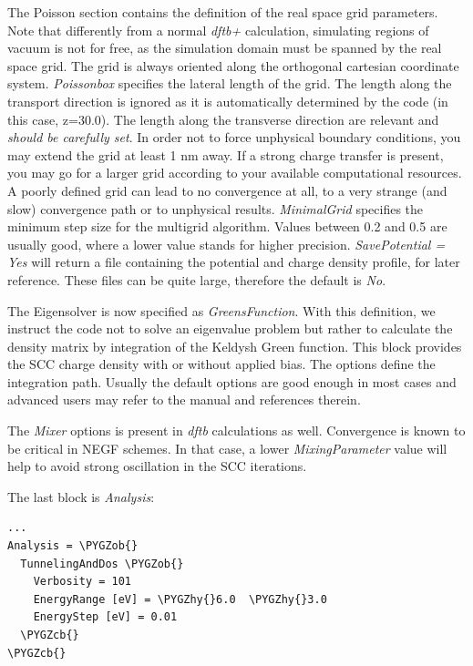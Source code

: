 \documentclass[a4paper,11pt,english]{sphinxmanual}
\def\PYGZob{\char`\{}
\def\PYGZcb{\char`\}}
\def\PYGZhy{\char`\-}
\begin{document}
{{The Poisson section contains the definition of the real space grid
parameters. Note that differently from a normal \emph{dftb+} calculation,
simulating regions of vacuum is not for free, as the simulation domain
must be spanned by the real space grid. The grid is always oriented
along the orthogonal cartesian coordinate system. \emph{Poissonbox}
specifies the lateral length of the grid. The length along the
transport direction is ignored as it is automatically determined by
the code (in this case, z=30.0). The length along the transverse
direction are relevant and \emph{should be carefully set}. In order not to
force unphysical boundary conditions, you may extend the grid at least
1 nm away. If a strong charge transfer is present, you may go for a
larger grid according to your available computational resources. A
poorly defined grid can lead to no convergence at all, to a very
strange (and slow) convergence path or to unphysical
results. \emph{MinimalGrid} specifies the minimum step size for the
multigrid algorithm. Values between 0.2 and 0.5 are usually good,
where a lower value stands for higher precision. \emph{SavePotential = Yes}
will return a file containing the potential and charge density
profile, for later reference. These files can be quite large,
therefore the default is \emph{No}.

The Eigensolver is now specified as \emph{GreensFunction}. With this
definition, we instruct the code not to solve an eigenvalue problem
but rather to calculate the density matrix by integration of the
Keldysh Green function. This block provides the SCC charge density
with or without applied bias. The options define the integration
path. Usually the default options are good enough in most cases and
advanced users may refer to the manual and references therein.

The \emph{Mixer} options is present in \emph{dftb} calculations as
well. Convergence is known to be critical in NEGF schemes. In that
case, a lower \emph{MixingParameter} value will help to avoid strong
oscillation in the SCC iterations.

The last block is \emph{Analysis}:

\begin{Verbatim}[commandchars=\\\{\}]
...
Analysis = \PYGZob{}
  TunnelingAndDos \PYGZob{}
    Verbosity = 101
    EnergyRange [eV] = \PYGZhy{}6.0  \PYGZhy{}3.0
    EnergyStep [eV] = 0.01
  \PYGZcb{}
\PYGZcb{}
\end{Verbatim}

}}
\end{document}

